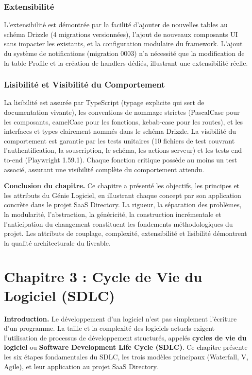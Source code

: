 \subsubsection{Extensibilité}

L'extensibilité est démontrée par la facilité d'ajouter de nouvelles tables au schéma Drizzle (4 migrations versionnées), l'ajout de nouveaux composants UI sans impacter les existants, et la configuration modulaire du framework. L'ajout du système de notifications (migration 0003) n'a nécessité que la modification de la table Profile et la création de handlers dédiés, illustrant une extensibilité réelle.

\subsubsection{Lisibilité et Visibilité du Comportement}

La lisibilité est assurée par TypeScript (typage explicite qui sert de documentation vivante), les conventions de nommage strictes (PascalCase pour les composants, camelCase pour les fonctions, kebab-case pour les routes), et les interfaces et types clairement nommés dans le schéma Drizzle. La visibilité du comportement est garantie par les tests unitaires (10 fichiers de test couvrant l'authentification, la souscription, le schéma, les actions serveur) et les tests end-to-end (Playwright 1.59.1). Chaque fonction critique possède au moins un test associé, assurant une visibilité complète du comportement attendu.

\textbf{Conclusion du chapitre.} Ce chapitre a présenté les objectifs, les principes et les attributs du Génie Logiciel, en illustrant chaque concept par son application concrète dans le projet SaaS Directory. La rigueur, la séparation des problèmes, la modularité, l'abstraction, la généricité, la construction incrémentale et l'anticipation du changement constituent les fondements méthodologiques du projet. Les attributs de couplage, complexité, extensibilité et lisibilité démontrent la qualité architecturale du livrable.


\section{Chapitre 3 : Cycle de Vie du Logiciel (SDLC)}

\textbf{Introduction.} Le développement d'un logiciel n'est pas simplement l'écriture d'un programme. La taille et la complexité des logiciels actuels exigent l'utilisation de processus de développement structurés, appelés \textbf{cycles de vie du logiciel} ou \textbf{Software Development Life Cycle (SDLC)}. Ce chapitre présente les six étapes fondamentales du SDLC, les trois modèles principaux (Waterfall, V, Agile), et leur application au projet SaaS Directory.


